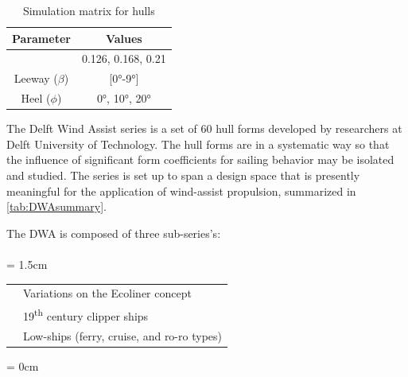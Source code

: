 \documentclass[twoside,twocolumn]{article}
\begin{document}
	\begin{table}[]
		\caption{Simulation matrix for \DWA hulls}
		\label{tab:parameters}
		\begin{tabular}{@{}cc@{}}
			\toprule
			\textbf{Parameter} & \textbf{Values} \\ \midrule
			\Fn & 0.126, 0.168, 0.21 \\
			Leeway ($\beta$) & [\ang{0}-\ang{9}] \\
			Heel ($\phi$) & \ang{0}, \ang{10}, \ang{20} \\ \bottomrule
		\end{tabular}
	\end{table}
	
	The Delft Wind Assist series is a set of 60 hull forms developed by researchers at Delft University of Technology. The hull forms are  in a systematic way so that the influence of significant form coefficients for sailing behavior may be isolated and studied. The series is set up to span a design space that is presently meaningful for the application of wind-assist propulsion, summarized in \cref{tab:DWAsummary}.
	
	The DWA is composed of three sub-series's: \\
	\\ 
	\leftskip = 1.5cm
	\begin{tabular}[!th]{p{1.5cm}p{4cm}}
		\firstseries & Variations on the Ecoliner concept \cite{Ecoliner} \\
		\secondseries &  19\textsuperscript{th} century clipper ships \\ 
		\thirdseries & Low-\Cp \space ships (ferry, cruise, and ro-ro types) \\ 
	\end{tabular}
	\leftskip = 0cm
	
\end{document}
